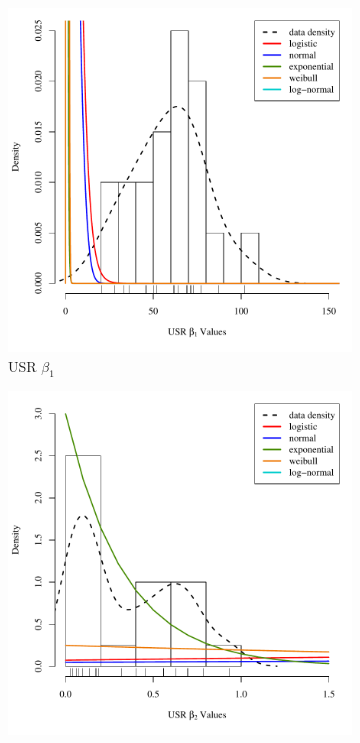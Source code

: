 \begin{linenumbers}
\begin{figure}[htbp]
\centering
\begin{subfigure}{0.5\textwidth}
	\centering
	\includegraphics[width=0.9\linewidth]{"Figures/Results_USR/USR B1 Dist"}
	\caption{USR $\beta_1$}
	\label{sub b1}
\end{subfigure}%
\begin{subfigure}{0.5\textwidth}
	\centering
	\includegraphics[width=0.9\linewidth]{"Figures/Results_USR/USR B2 Dist"}

\end{subfigure}
\end{figure}
\end{linenumbers}
